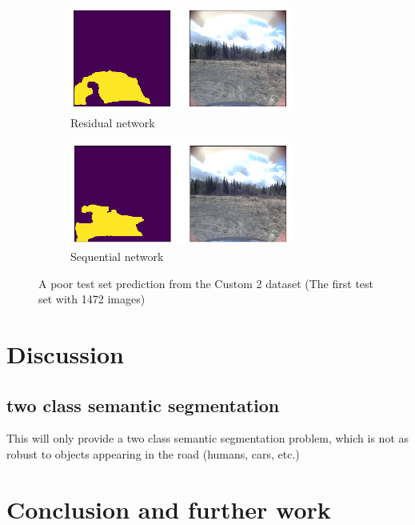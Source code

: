 \documentclass[USenglish]{ifimaster}  %
\begin{document}
\begin{figure}[ht]
\centering
\begin{subfigure}[b]{\textwidth}
\centering
\includegraphics[width=0.8\textwidth]{bilder/custom_2/154_res_poor.png}
\caption{Residual network}
\label{fig:custom_2_poor_res}
\end{subfigure}
\hfill
\begin{subfigure}[b]{\textwidth}
\centering
\includegraphics[width=0.8\textwidth]{bilder/custom_2/154_seq_poor.png}
\caption{Sequential network}
\label{fig:custom_2_poor_seq}
\end{subfigure}
\caption{A poor test set prediction from the Custom 2 dataset (The first test set with 1472 images)}
\end{figure}

\chapter{Discussion}
\section{two class semantic segmentation}
This will only provide a two class semantic segmentation problem, which is not as robust to objects appearing in the road (humans, cars, etc.) 

\chapter{Conclusion and further work}



\backmatter{}
\printbibliography
\end{document}
